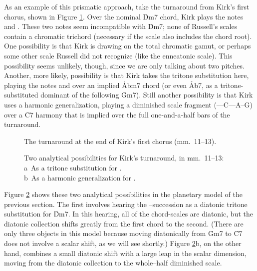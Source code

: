 As an example of this prismatic approach, take the turnaround from Kirk's
first chorus, shown in Figure \ref{csa:first-chorus-turnaround}. Over the
nominal \h{Dm7} chord, Kirk plays the notes \Eflat and \Dflat. These two notes
seem incompatible with \h{Dm7}; none of Russell's scales contain a chromatic
trichord (necessary if the scale also includes the chord root). One
possibility is that Kirk is drawing on the total chromatic gamut, or perhaps
some other scale Russell did not recognize (like the enneatonic scale). This
possibility seems unlikely, though, since we are only talking about two
pitches. Another, more likely, possibility is that Kirk takes the tritone
substitution here, playing the notes \Eflat and \Dflat over an implied
\h{Abm7} chord (or even \h{Ab7}, as a tritone-substituted dominant of the
following \h{Gm7}). Still another possibility is that Kirk uses a harmonic
generalization, playing a diminished scale fragment
(\Eflat--\Dflat--C--\Bflat--A--G) over a \h{C7} harmony that is implied over
the full one-and-a-half bars of the turnaround.

\begin{figure}[tbp]
  \caption{The turnaround at the end of Kirk's first chorus (mm.~11--13).}
  \label{csa:first-chorus-turnaround}
\end{figure}

\begin{figure}[tbp]
  \captionsetup{format=hang}
  \caption[Two analytical possibilities for Kirk's turnaround.]{%
    Two analytical possibilities for Kirk's turnaround, in mm.~11--13: \\
    a\rightparen\ As a tritone substitution for . \\
    b\rightparen\ As a harmonic generalization for .}
  \label{csa:turnaround-transformations}
\end{figure}

Figure \ref{csa:turnaround-transformations} shows these two analytical
possibilities in the planetary model of the previous section. The first
involves hearing the \Eflat--\Dflat succession as a diatonic tritone
substitution for \h{Dm7}. In this hearing, all of the chord-scales
are diatonic, but the diatonic collection shifts greatly from the first chord
to the second. (There are only three objects in this model because moving
diatonically from \h{Gm7} to \h{C7} does not involve a scalar shift, as we
will see shortly.) Figure \ref{csa:turnaround-transformations}b, on the other
hand, combines a small diatonic shift with a large leap in the scalar
dimension, moving from the diatonic collection to the whole--half diminished
scale.

